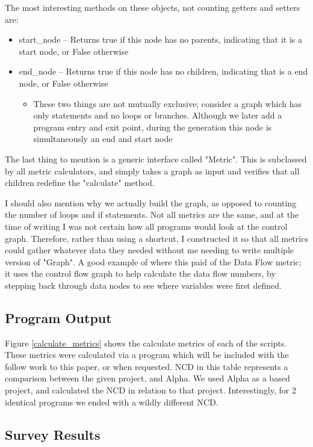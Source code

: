 \documentclass[]{article}
\begin{document}
The most interesting methods on these objects, not counting getters and setters are:
\begin{itemize}
	\item start\_node -- Returns true if this node has no parents, indicating that it is a start node, or False otherwise
	\item end\_node -- Returns true if this node has no children, indicating that is a end node, or False otherwise
	\begin{itemize}
		\item These two things are not mutually exclusive; consider a graph which has only statements and no loops or branches. Although we later add a program entry and exit point, during the generation this node is simultaneously an end and start node
	\end{itemize}
\end{itemize}

The last thing to mention is a generic interface called "Metric".
This is subclassed by all metric calculators, and simply takes a graph as input and verifies that all children redefine the "calculate" method.

I should also mention why we actually build the graph, as opposed to counting the number of loops and if statements.
Not all metrics are the same, and at the time of writing I was not certain how all programs would look at the control graph.
Therefore, rather than using a shortcut, I constructed it so that all metrics could gather whatever data they needed without me needing to write multiple version of "Graph".
A good example of where this paid of the Data Flow metric; it uses the control flow graph to help calculate the data flow numbers, by stepping back through data nodes to see where variables were first defined.

\subsection{Program Output}

Figure \ref{calculate_metrics} shows the calculate metrics of each of the scripts.
These metrics were calculated via a program which will be included with the follow work to this paper, or when requested.
NCD in this table represents a comparison between the given project, and Alpha. 
We used Alpha as a based project, and calculated the NCD in relation to that project.
Interestingly, for 2 identical programs we ended with a wildly different NCD.

\subsection{Survey Results}
\end{document}
